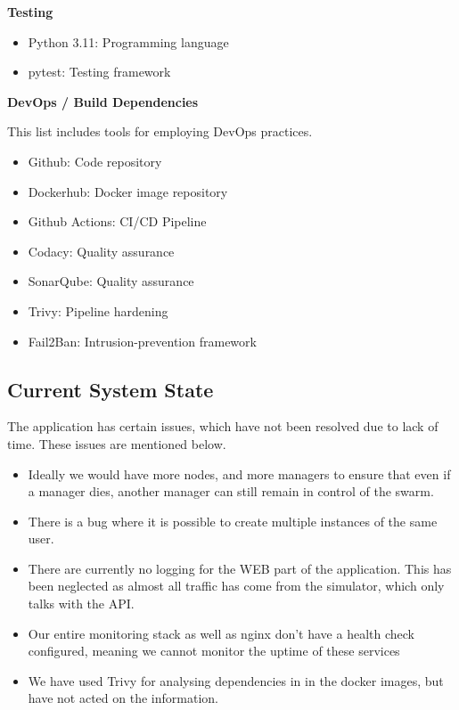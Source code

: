 \textbf{Testing}

\begin{itemize}
    \item Python 3.11: Programming language
    \item pytest: Testing framework
    
\end{itemize}

\textbf{DevOps / Build Dependencies}

This list includes tools for employing DevOps practices. 

\begin{itemize}
    \item Github: Code repository
    \item Dockerhub: Docker image repository
    \item Github Actions: CI/CD Pipeline
    \item Codacy: Quality assurance
    \item SonarQube: Quality assurance
    \item Trivy: Pipeline hardening
    \item Fail2Ban: Intrusion-prevention framework
\end{itemize}

\subsection{Current System State}

The application has certain issues, which have not been resolved due to lack of time. These issues are mentioned below.

\begin{itemize}
    \item Ideally we would have more nodes, and more managers to ensure that even if a manager dies, another manager can still remain in control of the swarm.
    \item There is a bug where it is possible to create multiple instances of the same user.
    \item There are currently no logging for the WEB part of the application. This has been neglected as almost all traffic has come from the simulator, which only talks with the API.
    \item Our entire monitoring stack as well as nginx don't have a health check configured, meaning we cannot monitor the uptime of these services
    \item We have used Trivy for analysing dependencies in in the docker images, but have not acted on the information.
\end{itemize}

